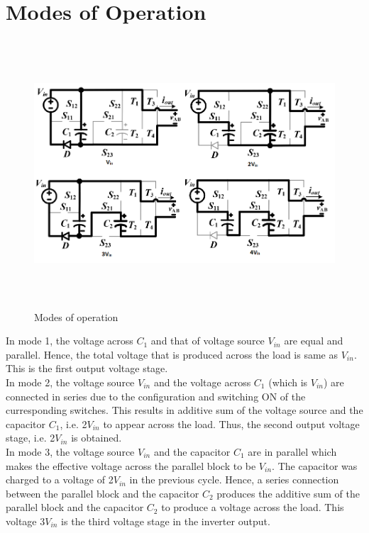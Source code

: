 \documentclass[12pt,a4paper]{report}
\begin{document}
\section{Modes of Operation}

\begin{figure}[h!]
	
	\includegraphics[width=16.5cm,height=10cm]{figures/Mode}
	\caption{Modes of operation}
	\label{moo}
\end{figure}

In mode 1, the voltage across $C_1$ and that of voltage source $V_{in}$ are equal and parallel. Hence, the total voltage that is produced across the load is same as $V_{in}$. This is the first output voltage stage. \\

In mode 2, the voltage source $V_{in}$ and the voltage across $C_1$ (which is $V_{in}$) are connected in series due to the configuration and switching ON of the curresponding switches. This results in additive sum of the voltage source and the capacitor $C_1$, i.e. 2$V_{in}$ to appear across the load. Thus, the second output voltage stage, i.e. 2$V_{in}$ is obtained. \\

In mode 3, the voltage source $V_{in}$ and the capacitor $C_1$ are in parallel which makes the effective voltage across the parallel block to be $V_{in}$. The capacitor was charged to a voltage of 2$V_{in}$ in the previous cycle. Hence, a series connection between the parallel block and the capacitor $C_2$ produces the additive sum of the parallel block and the capacitor $C_2$ to produce a voltage across the load. This voltage 3$V_{in}$ is the third voltage stage in the inverter output. \\
\end{document}
